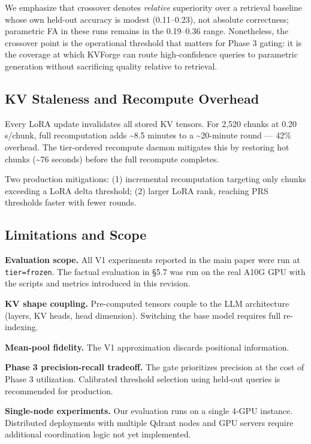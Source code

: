 \documentclass[10pt,twocolumn]{article}
\begin{document}
We emphasize that crossover denotes \textit{relative} superiority over a retrieval baseline whose own held-out accuracy is modest (0.11--0.23), not absolute correctness; parametric FA in these runs remains in the 0.19--0.36 range. Nonetheless, the crossover point is the operational threshold that matters for Phase 3 gating: it is the coverage at which KVForge can route high-confidence queries to parametric generation without sacrificing quality relative to retrieval.


\subsection{KV Staleness and Recompute Overhead}

Every LoRA update invalidates all stored KV tensors. For 2,520 chunks at 0.20 s/chunk, full recomputation adds \textasciitilde{}8.5 minutes to a \textasciitilde{}20-minute round --- 42\% overhead. The tier-ordered recompute daemon mitigates this by restoring hot chunks (\textasciitilde{}76 seconds) before the full recompute completes.


Two production mitigations: (1) incremental recomputation targeting only chunks exceeding a LoRA delta threshold; (2) larger LoRA rank, reaching PRS thresholds faster with fewer rounds.


\subsection{Limitations and Scope}

\textbf{Evaluation scope.} All V1 experiments reported in the main paper were run at \texttt{tier=frozen}. The factual evaluation in \S{}5.7 was run on the real A10G GPU with the scripts and metrics introduced in this revision.


\textbf{KV shape coupling.} Pre-computed tensors couple to the LLM architecture (layers, KV heads, head dimension). Switching the base model requires full re-indexing.


\textbf{Mean-pool fidelity.} The V1 approximation discards positional information.


\textbf{Phase 3 precision-recall tradeoff.} The gate prioritizes precision at the cost of Phase 3 utilization. Calibrated threshold selection using held-out queries is recommended for production.


\textbf{Single-node experiments.} Our evaluation runs on a single 4-GPU instance. Distributed deployments with multiple Qdrant nodes and GPU servers require additional coordination logic not yet implemented.
\end{document}

